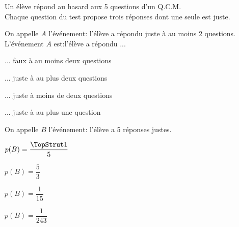 \begin{QCM}
\begin{EnonceCommunQCM}
Un élève répond au hasard aux 5 questions d'un Q.C.M. \\Chaque question du test propose trois réponses dont une seule est juste.
\end{EnonceCommunQCM}
\begin{GroupeQCM}
\begin{exercice}On appelle $A$ l'événement: \og l'élève a répondu juste à au moins 2 questions\fg.\\ L'événement $\overline{A}$ est:\og l'élève a répondu ...
\begin{ChoixQCM}{2}
\item ... faux à au moins deux questions\fg 
\item ... juste à au plus deux questions\fg 
\item ... juste à moins de deux questions\fg 
\item ... juste à au plus une question\fg 
\end{ChoixQCM}
 \begin{corrige}
    \end{corrige}
\end{exercice}
\end{GroupeQCM}

\begin{GroupeQCM}
\begin{exercice}On appelle $B$ l'événement: \og l'élève a 5 réponses justes\fg.
\begin{ChoixQCM}{4}
\item $p(B)=\dfrac{\TopStrut 1}{5}$
\item $p(B)=\dfrac{5}{3}$
\item $p(B)=\dfrac{1}{15}$
\item $p(B)=\dfrac{1}{243}$
\end{ChoixQCM}
 \begin{corrige}
    \end{corrige}
\end{exercice}

\end{GroupeQCM}
\end{QCM}


